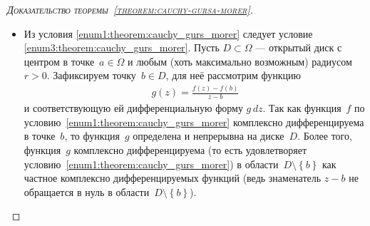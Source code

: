 \documentclass[../complex-analysis.tex]{subfiles}
\begin{document}
\begin{proof}[\normalfont\textsc{Доказательство теоремы~\ref{theorem:cauchy-gursa-morer}}]
\begin{itemize}
   По прямоугольнику~$\Pi_1$ таким же образом построим прямоугольник~$\Pi_2$, затем по $ \Pi_2 $ построим $\Pi_3$, и так далее. Мы получим последовательность вложенных прямоугольников
   \begin{align*}
    \Pi_0 \supset \Pi_1 \supset \Pi_2 \supset \ldots,
   \end{align*} обладающих свойством \begin{align}
    \label{eq:large_rect_int:cauchy_gurs_morer}
    \left| \int_{\partial\Pi_n} f\,dz  \right| \geqslant \eps\delta_n^{2}.
   \end{align} По теореме о вложенных компактах их пересечение не пустое:
   \begin{align*}
     a  \in \bigcap_{n=0}^{\infty}\Pi_n.
   \end{align*} Теперь, пользуясь комплексной дифференцируемостью функции~$ f $, выразим интеграл функции по контуру $ \partial\Pi_n $ при $ n \to \infty $ в терминах производной в точке $ z $:
   \begin{align*}
    \int_{\partial\Pi_n} f(z)\,dz &= \int_{\partial\Pi_n} \left( f(a) + f'(a) \cdot (z-a) + o(z-a) \right)dz = \\
    &= \int_{\partial\Pi_n} \left( p+qz \right)dz + \int_{\partial\Pi_n} o(z-a)\,dz
   \end{align*} для некоторых комплексных чисел~$ p,q\in\CC $. Но так как форма~$ (p+qz)\,dz $ замкнута в $ \CC $ (пример~\ref{example:form_a_plus_b_times_z_dz}), то левое слагаемое равно нулю, и тогда по оценке интеграла \eqref{eq:bound_on_absolute_value_of_int}:
   \begin{align*}
    \int_{\partial\Pi_n} f\,dz  &= \int_{\partial\Pi_n}  o(z-a)\,dz = \int_{\partial\Pi_n} o(\delta_n) =   o(\delta_n^{2}).
   \end{align*} Но это противоречит \eqref{eq:large_rect_int:cauchy_gurs_morer}! Таким образом, тест на прямоугольнике пройдён, и форма~$ f\,dz $ действительно замкнута в $ \Omega $.

  \item Из условия \ref{enum1:theorem:cauchy_gurs_morer} следует условие \ref{enum3:theorem:cauchy_gurs_morer}. Пусть $ D \subset \Omega$ --- открытый диск с центром в точке~$ a \in \Omega $ и любым (хоть максимально возможным) радиусом~$ r > 0 $. Зафиксируем точку~$ b \in D $, для неё рассмотрим функцию
   \begin{align*}
    g(z) = \frac{f(z)-f(b)}{z-b}
   \end{align*} и соответствующую ей дифференциальную форму $ g\,dz $. Так как функция~$ f $ по условию~\ref{enum1:theorem:cauchy_gurs_morer} комплексно дифференцируема в точке~$ b $, то функция~$ g $ определена и непрерывна на диске~$ D $. Более того, функция~$ g $ комплексно дифференцируема (то есть удовлетворяет условию~\ref{enum1:theorem:cauchy_gurs_morer}) в области~$ D \setminus \left\{ b \right\} $ как частное комплексно дифференцируемых функций (ведь знаменатель $ z-b $ не обращается в нуль в области~$ D \setminus \left\{ b \right\} $).


\end{itemize}
\end{proof}
\end{document}
